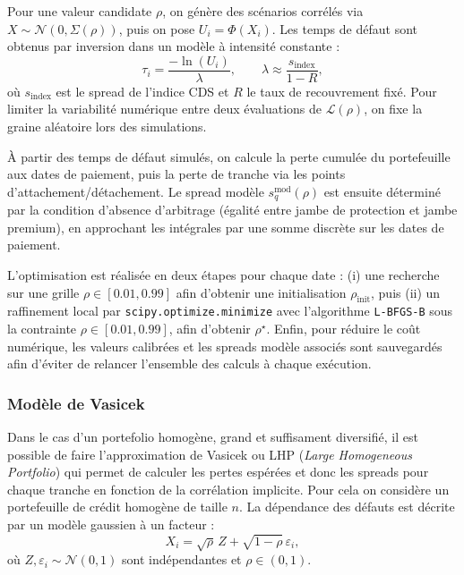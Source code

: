 Pour une valeur candidate \(\rho\), on génère des scénarios corrélés via
\(X \sim \mathcal{N}(0,\Sigma(\rho))\), puis on pose \(U_i=\Phi(X_i)\). Les temps de défaut
sont obtenus par inversion dans un modèle à intensité constante :
\[
\tau_i = \frac{-\ln(U_i)}{\lambda},
\qquad
\lambda \approx \frac{s_{\text{index}}}{1-R},
\]
où \(s_{\text{index}}\) est le spread de l’indice CDS et \(R\) le taux de recouvrement fixé.
Pour limiter la variabilité numérique entre deux évaluations de \(\mathcal{L}(\rho)\), on fixe
la graine aléatoire lors des simulations.

À partir des temps de défaut simulés, on calcule la perte cumulée du portefeuille aux dates
de paiement, puis la perte de tranche via les points d’attachement/détachement. Le spread
modèle \(s^{\mathrm{mod}}_q(\rho)\) est ensuite déterminé par la condition d’absence d’arbitrage
(égalité entre jambe de protection et jambe premium), en approchant les intégrales par une
somme discrète sur les dates de paiement.

L’optimisation est réalisée en deux étapes pour chaque date : (i) une recherche sur une grille
\(\rho \in [0.01,0.99]\) afin d’obtenir une initialisation \(\rho_{\text{init}}\), puis (ii) un
raffinement local par \texttt{scipy.optimize.minimize} avec l’algorithme \texttt{L-BFGS-B}
sous la contrainte \(\rho \in [0.01,0.99]\), afin d’obtenir \(\rho^\star\). Enfin, pour réduire
le coût numérique, les valeurs calibrées et les spreads modèle associés sont sauvegardés afin
d’éviter de relancer l’ensemble des calculs à chaque exécution.



\subsubsection{Modèle de Vasicek}

Dans le cas d'un portefolio homogène, grand et suffisament diversifié, il est possible
de faire l'approximation de Vasicek ou LHP (\emph{Large Homogeneous Portfolio}) qui permet de calculer les pertes espérées et donc
les spreads pour chaque tranche en fonction de la corrélation implicite. Pour cela on considère un portefeuille de crédit homogène de taille $n$.
La dépendance des défauts est décrite par un modèle gaussien à un facteur :
\begin{equation}
    X_i = \sqrt{\rho}\,Z + \sqrt{1-\rho}\,\varepsilon_i,
\end{equation}
où $Z,\varepsilon_i \sim \mathcal N(0,1)$ sont indépendantes et $\rho \in (0,1)$. 

